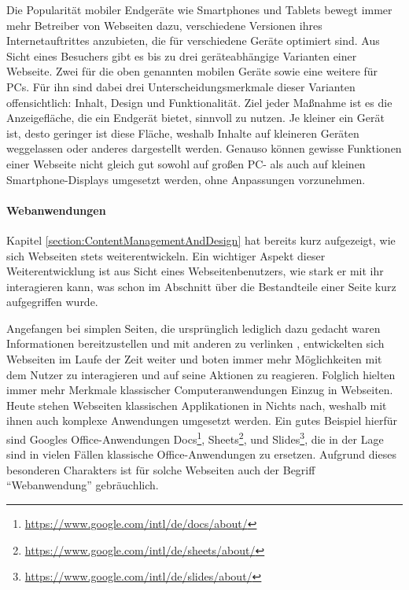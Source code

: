             Die Popularität mobiler Endgeräte wie Smartphones und Tablets
            bewegt immer mehr Betreiber von Webseiten dazu,
            verschiedene Versionen ihres Internetauftrittes anzubieten,
            die für verschiedene Geräte optimiert sind.
            Aus Sicht eines Besuchers gibt es bis zu drei geräteabhängige
            Varianten einer Webseite. Zwei für die oben genannten mobilen Geräte
            sowie eine weitere für PCs.
            Für ihn sind dabei drei Unterscheidungsmerkmale dieser Varianten offensichtlich:
            Inhalt, Design und Funktionalität.
            Ziel jeder Maßnahme ist es die Anzeigefläche,
            die ein Endgerät bietet, sinnvoll zu nutzen.
            Je kleiner ein Gerät ist, desto geringer ist diese Fläche,
            weshalb Inhalte auf kleineren Geräten weggelassen oder anderes
            dargestellt werden.
            Genauso können gewisse Funktionen einer Webseite nicht gleich
            gut sowohl auf großen PC- als auch auf kleinen Smartphone-Displays
            umgesetzt werden, ohne Anpassungen vorzunehmen.
            
            \paragraph*{Webanwendungen}
            Kapitel \ref{section:ContentManagementAndDesign} hat bereits
            kurz aufgezeigt, wie sich Webseiten stets weiterentwickeln.
            Ein wichtiger Aspekt dieser Weiterentwicklung ist aus Sicht
            eines Webseitenbenutzers, wie stark er mit ihr interagieren kann,
            was schon im Abschnitt über die Bestandteile einer Seite kurz aufgegriffen wurde.

            Angefangen bei simplen Seiten,
            die ursprünglich lediglich dazu gedacht waren Informationen
            bereitzustellen und mit anderen zu
            verlinken \cite{bernersLee:InformationManagement},
            entwickelten sich Webseiten im Laufe der Zeit weiter
            und boten immer mehr Möglichkeiten mit dem Nutzer zu interagieren
            und auf seine Aktionen zu reagieren.
            Folglich hielten immer mehr Merkmale klassischer Computeranwendungen
            Einzug in Webseiten.
            Heute stehen Webseiten klassischen Applikationen in Nichts nach,
            weshalb mit ihnen auch komplexe Anwendungen umgesetzt werden.
            Ein gutes Beispiel hierfür sind Googles Office-Anwendungen
            Docs\footnote{\url{https://www.google.com/intl/de/docs/about/}},
            Sheets\footnote{\url{https://www.google.com/intl/de/sheets/about/}},
            und Slides\footnote{\url{https://www.google.com/intl/de/slides/about/}},
            die in der Lage sind in vielen Fällen klassische Office-Anwendungen zu ersetzen.
            Aufgrund dieses besonderen Charakters ist für solche Webseiten auch der Begriff
            "`Webanwendung"' gebräuchlich.

